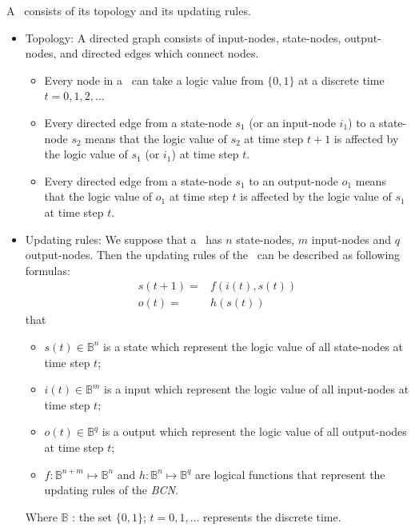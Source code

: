 \begin{definition} A \BCN\ consists of its topology and its updating rules.\cite{Ideker2001A}
\begin{itemize}
  \item Topology:  A directed graph consists of input-nodes, state-nodes, output-nodes, and directed edges which connect nodes. 
	\begin{itemize}
	\item Every node in a \BCN\ can take a logic value from $\{0,1\}$ at a discrete time $t=0, 1, 2,\ldots$ 
	
	\item Every directed edge from a state-node $s_1$ (or an input-node $i_1$) to a state-node $s_2$ means that the logic value of $s_2$ at time step $t+1$ is affected by the logic value of $s_1$ (or $i_1$)  at time step $t$. 
	
	\item Every directed edge from a state-node $s_1$ to an output-node $o_1$ means that the logic value of $o_1$ at time step $t$ is affected by the logic value of $s_1$  at time step $t$.  
	\end{itemize}
  \item Updating rules: We suppose that a \BCN\ has $n$ state-nodes, $m$ input-nodes and $q$ output-nodes. Then the updating rules of the \BCN\ can be described as following formulas:
\begin{equation}
\begin{split}
s(t+1)=&f(i(t),s(t))\\
o(t)=&h(s(t))
\end{split}
\label{equ:1}
\end{equation}
that 
\begin{itemize}
	\item $s(t)\in \mathbb{B}^n$ is a state which represent the logic value of all state-nodes at time step $t$; 	
	\item $i(t)\in \mathbb{B}^m$ is a input which represent the logic value of all input-nodes at time step $t$; 	
	\item $o(t)\in \mathbb{B}^q$ is a output which represent the logic value of all output-nodes at time step $t$;  
	\item $f:\mathbb{B}^{n+m}\mapsto \mathbb{B}^n$ and $h:\mathbb{B}^n\mapsto \mathbb{B}^q$ are logical functions that represent the updating rules of the {\em BCN}. 
	\end{itemize}
Where $\mathbb{B}$ : the set $\{0,1\}$; $t=0,1,\ldots$ represents the discrete time. 
\end{itemize}

\end{definition}

